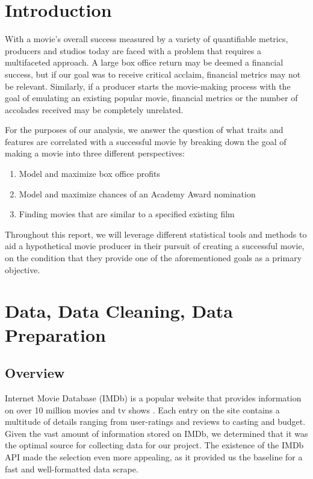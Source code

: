 \documentclass[10pt]{article}
\begin{document}
\section{Introduction}

With a movie’s overall success measured by a variety of quantifiable metrics, producers and studios today are faced with a problem that requires a multifaceted approach. A large box office return may be deemed a financial success, but if our goal was to receive critical acclaim, financial metrics may not be relevant. Similarly, if a producer starts the movie-making process with the goal of emulating an existing popular movie, financial metrics or the number of accolades received may be completely unrelated.

For the purposes of our analysis, we answer the question of what traits and features are correlated with a successful movie by breaking down the goal of making a movie into three different perspectives:

\begin{enumerate}
\item Model and maximize box office profits
\item Model and maximize chances of an Academy Award nomination
\item Finding movies that are similar to a specified existing film
\end{enumerate}

Throughout this report, we will leverage different statistical tools and methods to aid a hypothetical movie producer in their pursuit of creating a successful movie, on the condition that they provide one of the aforementioned goals as a primary objective.


\section{Data, Data Cleaning, Data Preparation}

\subsection{Overview}

Internet Movie Database (IMDb) is a popular website that provides information on over 10 million movies and tv shows \cite{1}. Each entry on the site contains a multitude of details ranging from user-ratings and reviews to casting and budget. Given the vast amount of information stored on IMDb, we determined that it was the optimal source for collecting data for our project. The existence of the IMDb API made the selection even more appealing, as it provided us the baseline for a fast and well-formatted data scrape.
\end{document}
